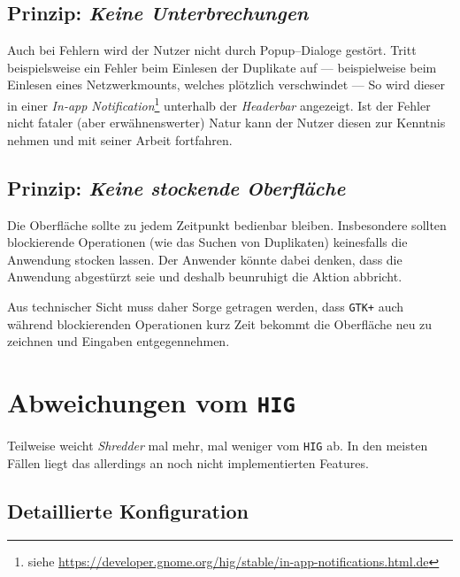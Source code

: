 \documentclass[11pt,ngerman,toc=listof,index=totoc]{scrreprt}
\begin{document}
\subsection{\texorpdfstring{Prinzip: \emph{Keine
Unterbrechungen}}{Prinzip: Keine Unterbrechungen}}\label{prinzip-keine-unterbrechungen}

Auch bei Fehlern wird der Nutzer nicht durch Popup--Dialoge gestört.
Tritt beispielsweise ein Fehler beim Einlesen der Duplikate auf ---
beispielweise beim Einlesen eines Netzwerkmounts, welches plötzlich
verschwindet --- So wird dieser in einer \emph{In-app
Notification}\footnote{siehe
  \url{https://developer.gnome.org/hig/stable/in-app-notifications.html.de}}
unterhalb der \emph{Headerbar} angezeigt. Ist der Fehler nicht fataler
(aber erwähnenswerter) Natur kann der Nutzer diesen zur Kenntnis nehmen
und mit seiner Arbeit fortfahren.

\subsection{\texorpdfstring{Prinzip: \emph{Keine stockende
Oberfläche}}{Prinzip: Keine stockende Oberfläche}}\label{prinzip-keine-stockende-oberfluxe4che}

Die Oberfläche sollte zu jedem Zeitpunkt bedienbar bleiben. Insbesondere
sollten blockierende Operationen (wie das Suchen von Duplikaten)
keinesfalls die Anwendung stocken lassen. Der Anwender könnte dabei
denken, dass die Anwendung abgestürzt seie und deshalb beunruhigt die
Aktion abbricht.

Aus technischer Sicht muss daher Sorge getragen werden, dass
\texttt{GTK+} auch während blockierenden Operationen kurz Zeit bekommt
die Oberfläche neu zu zeichnen und Eingaben entgegennehmen.

\section{\texorpdfstring{Abweichungen vom
\texttt{HIG}}{Abweichungen vom HIG}}\label{abweichungen-vom-hig}

Teilweise weicht \emph{Shredder} mal mehr, mal weniger vom \texttt{HIG}
ab. In den meisten Fällen liegt das allerdings an noch nicht
implementierten Features.

\subsection{Detaillierte
Konfiguration}\label{detaillierte-konfiguration}
\end{document}
